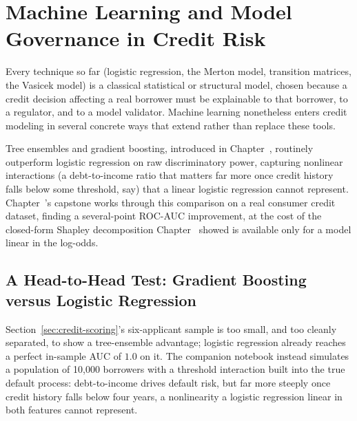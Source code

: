\documentclass[../ai_in_finance]{subfiles}
\begin{document}
\section{Machine Learning and Model Governance in Credit Risk}
\label{sec:credit-ml}

Every technique so far (logistic regression, the Merton model, transition matrices, the Vasicek model) is a classical statistical or structural model, chosen because a credit decision affecting a real borrower must be explainable to that borrower, to a regulator, and to a model validator. Machine learning nonetheless enters credit modeling in several concrete ways that extend rather than replace these tools.

Tree ensembles and gradient boosting, introduced in Chapter~, routinely outperform logistic regression on raw discriminatory power, capturing nonlinear interactions (a debt-to-income ratio that matters far more once credit history falls below some threshold, say) that a linear logistic regression cannot represent. Chapter~'s capstone works through this comparison on a real consumer credit dataset, finding a several-point ROC-AUC improvement, at the cost of the closed-form Shapley decomposition Chapter~ showed is available only for a model linear in the log-odds.

\subsection{A Head-to-Head Test: Gradient Boosting versus Logistic Regression}
\label{sec:ml-credit-scoring}

Section~\ref{sec:credit-scoring}'s six-applicant sample is too small, and too cleanly separated, to show a tree-ensemble advantage; logistic regression already reaches a perfect in-sample AUC of $1.0$ on it.
The companion notebook instead simulates a population of 10,000 borrowers with a threshold interaction built into the true default process: debt-to-income drives default risk, but far more steeply once credit history falls below four years, a nonlinearity a logistic regression linear in both features cannot represent.
\end{document}
